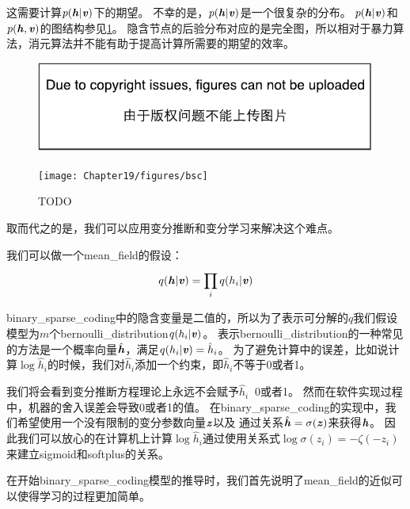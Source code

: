 这需要计算$p(\boldsymbol{\mathit{h}}\vert\boldsymbol{\mathit{v}})$下的期望。
不幸的是，$p(\boldsymbol{\mathit{h}}\vert\boldsymbol{\mathit{v}})$是一个很复杂的分布。
$p(\boldsymbol{\mathit{h}}\vert\boldsymbol{\mathit{v}})$和$p(\boldsymbol{\mathit{h}},\boldsymbol{\mathit{v}})$的图结构参见\ref{fig:bsc}。
隐含节点的后验分布对应的是完全图，所以相对于暴力算法，消元算法并不能有助于提高计算所需要的期望的效率。


\begin{figure}[!htb]
\ifOpenSource
\centerline{\includegraphics{figure.pdf}}
\else
	\centerline{\texttt{[image: Chapter19/figures/bsc]}}
\fi
	\caption{TODO}
	\label{fig:bsc}
\end{figure}



取而代之的是，我们可以应用变分推断和变分学习来解决这个难点。


我们可以做一个\gls{mean_field}的假设：
\begin{align}
	q(\boldsymbol{\mathit{h}}\vert\boldsymbol{\mathit{v}}) = \prod_{i}^{}q(h_i\vert\boldsymbol{\mathit{v}})
\end{align}


\gls{binary_sparse_coding}中的隐含变量是二值的，所以为了表示可分解的$q$我们假设模型为$m$个\gls{bernoulli_distribution}$q(h_i\vert\boldsymbol{\mathit{v}})$。
表示\gls{bernoulli_distribution}的一种常见的方法是一个概率向量$\hat{\boldsymbol{\mathit{h}}}$，满足$q(h_i\vert\boldsymbol{\mathit{v}}) = \hat{h}_i$。
为了避免计算中的误差，比如说计算$\log \hat{h}_i$的时候，我们对$\hat{h}_i$添加一个约束，即$\hat{h}_i$不等于0或者1。


我们将会看到变分推断方程理论上永远不会赋予$\hat{h}_i\ $ 0或者1。
然而在软件实现过程中，机器的舍入误差会导致0或者1的值。
在\gls{binary_sparse_coding}的实现中，我们希望使用一个没有限制的变分参数向量$\boldsymbol{\mathit{z}}$以及
通过关系$\hat{\boldsymbol{\mathit{h}}} = \sigma(\boldsymbol{\mathit{z}})$来获得$\boldsymbol{\mathit{h}}$。
因此我们可以放心的在计算机上计算$\log \hat{h}_i$通过使用关系式$\log \sigma(z_i) = -\zeta(-z_i)$来建立sigmoid和softplus的关系。


在开始\gls{binary_sparse_coding}模型的推导时，我们首先说明了\gls{mean_field}的近似可以使得学习的过程更加简单。


